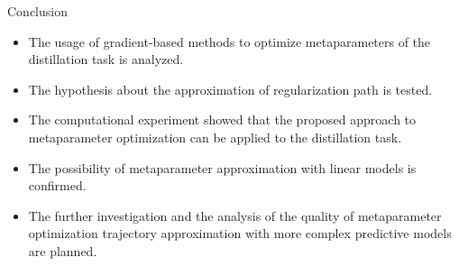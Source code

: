 \documentclass[12pt, aspectratio=169]{beamer}
\begin{document}
\begin{frame}{Conclusion}
    \begin{itemize}
        \item The usage of gradient-based methods to optimize metaparameters of the distillation task is analyzed. 
        \item The hypothesis about the approximation of regularization path is tested.
        \item The computational experiment showed that the proposed approach to metaparameter optimization can be applied to the distillation task.
        \item The possibility of metaparameter approximation with linear models is confirmed.
        \item The further investigation and the analysis of the quality of metaparameter optimization trajectory approximation with more complex predictive models are planned.
    \end{itemize}
\end{frame}


\end{document}
